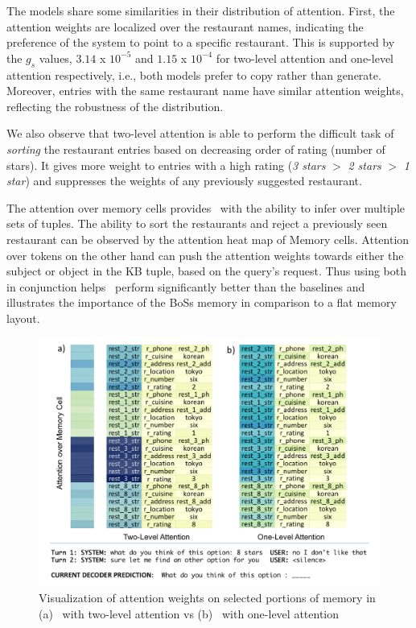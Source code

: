 The models share some similarities in their distribution of attention. First, the attention weights are localized over the restaurant names, indicating the preference of the system to point to a specific restaurant. This is supported by the $g_s$ values, $3.14$ x $10^{-5}$ and $1.15$ x $10^{-4}$ for two-level attention and one-level attention respectively, i.e., both models prefer to copy rather than generate. Moreover, entries with the same restaurant name have similar attention weights, reflecting the robustness of the distribution.

We also observe that two-level attention is able to perform the difficult task of {\em sorting} the restaurant entries based on decreasing order of rating (number of stars). It gives more weight to entries with a high rating 
(\textit{3 stars} $>$ \textit{2 stars} $>$ \textit{1 star})
and suppresses the weights of any previously suggested restaurant.

The attention over memory cells provides \sys\ with the ability to infer over multiple sets of tuples. The ability to sort the restaurants and reject a previously seen restaurant can be observed by the attention heat map of Memory cells. Attention over tokens on the other hand can push the attention weights towards either the subject or object in the KB tuple, based on the query's request. Thus using both in conjunction helps \sys\ perform significantly better than the baselines and illustrates the importance of the {\sc BoSs} memory in comparison to a flat memory layout.

\begin{figure}[ht]
\centering
\includegraphics[width=\textwidth]{assets/task3_two_level.png}
\caption{Visualization of attention weights on selected portions of memory in (a) \sys\ with two-level attention vs (b) \sys\ with one-level attention}
\label{fig:attention}
\end{figure}